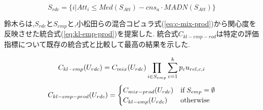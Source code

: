\begin{equation}
\label{eq:set_rdc}
S_{rdc}=\{i|Att_i \leq Med(S_{Att})-cns_a\cdot MADN(S_{Att})\}
\end{equation}

\begin{comment}
\begin{flalign}
\label{eq:set_emp}
 \centering
&S_{emp}=\{i|Med(S_{Att})+cns_a\cdot MADN(S_{Att})\leq Att_i\}& \\
\label{eq:set_rdc}
   \centering
&S_{rdc}=\{i|Att_i \leq Med(S_{Att})-cns_a\cdot MADN(S_{Att})\}&
\end{flalign}
\end{comment}
鈴木らは,$S_{rdc}$と$S_{emp}$と,小松田らの混合コピュラ式(\ref{eq:c-mix-prod})から関心度を反映させた統合式(\ref{eq:kl-emp-prod})を提案した.
統合式$C_{kl-emp-rod}$は特定の評価指標について既存の統合式と比較して最高の結果を示した.

\begin{equation}
    \label{eq:kl-emp}
    \centering
    C_{kl-emp}(U_{rdc}) =  C_{mix}(U_{rdc}) \prod_{i \in S_{emp}} \sum_{c=1}^{k} p_{c}u_{rel,c, i}
\end{equation}
\begin{equation}
    \label{eq:kl-emp-prod}
    \centering
    C_{kl-emp-prod}(U_{rdc}) = \begin{cases} C_{mix-prod}(U_{rdc}) & \text{if}\; S_{emp} =	 \emptyset\\ C_{kl-emp}(U_{rdc}) & \text{otherwise}\;   \end{cases}
\end{equation}
